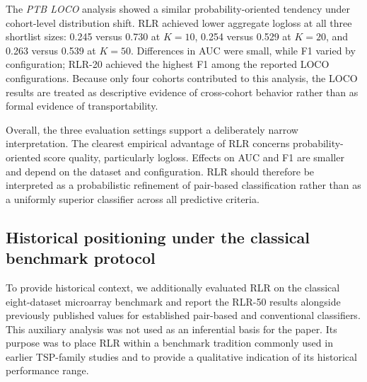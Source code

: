 \documentclass[journal]{IEEEtran}
\begin{document}
The \emph{PTB LOCO} analysis showed a similar probability-oriented tendency under cohort-level distribution shift. RLR achieved lower aggregate logloss at all three shortlist sizes: 0.245 versus 0.730 at $K=10$, 0.254 versus 0.529 at $K=20$, and 0.263 versus 0.539 at $K=50$. Differences in AUC were small, while F1 varied by configuration; RLR-20 achieved the highest F1 among the reported LOCO configurations. Because only four cohorts contributed to this analysis, the LOCO results are treated as descriptive evidence of cross-cohort behavior rather than as formal evidence of transportability.

Overall, the three evaluation settings support a deliberately narrow interpretation. The clearest empirical advantage of RLR concerns probability-oriented score quality, particularly logloss. Effects on AUC and F1 are smaller and depend on the dataset and configuration. RLR should therefore be interpreted as a probabilistic refinement of pair-based classification rather than as a uniformly superior classifier across all predictive criteria.

\subsection{Historical positioning under the classical benchmark protocol}

To provide historical context, we additionally evaluated RLR on the classical eight-dataset microarray benchmark and report the RLR-50 results alongside previously published values for established pair-based and conventional classifiers. This auxiliary analysis was not used as an inferential basis for the paper. Its purpose was to place RLR within a benchmark tradition commonly used in earlier TSP-family studies and to provide a qualitative indication of its historical performance range.
\end{document}
